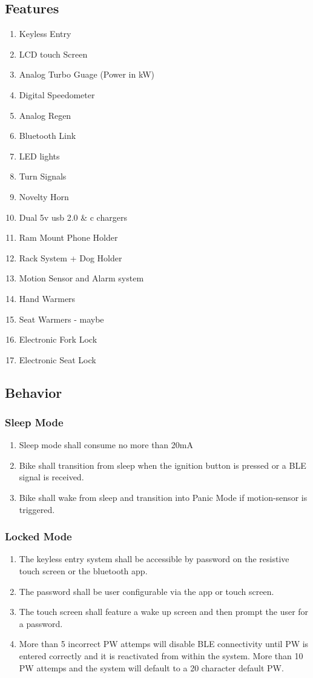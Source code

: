 \documentclass[12pt compsoc]{article}
\begin{document}
\subsection{Features}
\begin{enumerate}
\item Keyless Entry
\item LCD touch Screen
\item Analog Turbo Guage (Power in kW)
\item Digital Speedometer
\item Analog Regen
\item Bluetooth Link
\item LED lights
\item Turn Signals
\item Novelty Horn
\item Dual 5v usb 2.0 \& c chargers
\item Ram Mount Phone Holder
\item Rack System + Dog Holder
\item Motion Sensor and Alarm system
\item Hand Warmers
\item Seat Warmers - maybe
\item Electronic Fork Lock
\item Electronic Seat Lock
\end{enumerate}

\subsection{Behavior}
\subsubsection{Sleep Mode}
\begin{enumerate}
\item Sleep mode shall consume no more than 20mA
\item Bike shall transition from sleep when the ignition button is pressed or a BLE signal is received.
\item Bike shall wake from sleep and transition into Panic Mode if motion-sensor is triggered.
\end{enumerate}

\subsubsection{Locked Mode}
\begin{enumerate}
\item The keyless entry system shall be accessible by password on the resistive touch screen or the bluetooth app. \item The password shall be user configurable via the app or touch screen. 
\item The touch screen shall feature a wake up screen and then prompt the user for a password. 
\item More than 5 incorrect PW attemps will disable BLE connectivity until PW is entered correctly and it is reactivated from within the system. More than 10 PW attemps and the system will default to a 20 character default PW.
\end{enumerate}
\end{document}
